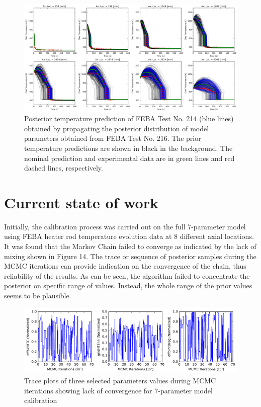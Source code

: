 \documentclass[11pt,titlepage]{article}
\begin{document}
\begin{figure}[h!]
	\centering
	\includegraphics[scale=0.95]{figures/uqrun.png}
	\caption{Posterior temperature prediction of FEBA Test No. 214 (blue lines)
	    obtained by propagating the posterior distribution of model parameters
	    obtained from FEBA Test No. 216. The prior temperature predictions are 
	    shown in black in the background. The nominal prediction and 
	    experimental data are in green lines and red dashed lines, respectively.}
	\label{fig:uqrun}
\end{figure}


\section{Current state of work}

Initially, the calibration process was carried out on the full 7-parameter 
model using FEBA heater rod temperature evolution data at 8 different axial 
locations. 
It was found that the Markov Chain failed to converge as indicated by the 
lack of mixing shown in Figure 14. 
The trace or sequence of posterior samples during the MCMC iterations can 
provide indication on the convergence of the chain, thus reliability of the 
results. As can be seen, the algorithm failed to concentrate the posterior 
on specific range of values. 
Instead, the whole range of the prior values seems to be plausible.

\begin{figure}[h!]
	\centering
	\includegraphics[scale=0.90]{figures/nonconv.png}
	\caption{Trace plots of three selected parameters values during 
	    MCMC iterations showing lack of convergence for 7-parameter
	    model calibration}
	\label{fig:nonconv}
\end{figure}
\end{document}

